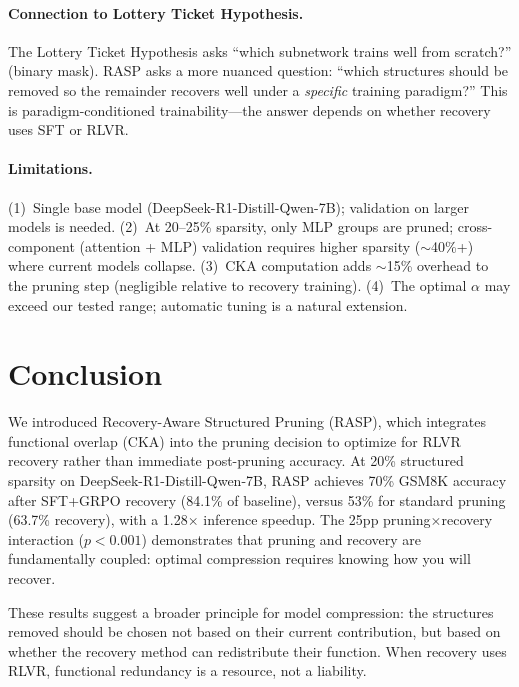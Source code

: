 \documentclass[11pt,a4paper]{article}
\newcommand{\method}{RASP}
\begin{document}
\paragraph{Connection to Lottery Ticket Hypothesis.} The Lottery Ticket Hypothesis asks ``which subnetwork trains well from scratch?'' (binary mask). \method{} asks a more nuanced question: ``which structures should be removed so the remainder recovers well under a \emph{specific} training paradigm?'' This is paradigm-conditioned trainability---the answer depends on whether recovery uses SFT or RLVR.

\paragraph{Limitations.} (1)~Single base model (DeepSeek-R1-Distill-Qwen-7B); validation on larger models is needed. (2)~At 20--25\% sparsity, only MLP groups are pruned; cross-component (attention + MLP) validation requires higher sparsity ($\sim$40\%+) where current models collapse. (3)~CKA computation adds $\sim$15\% overhead to the pruning step (negligible relative to recovery training). (4)~The optimal $\alpha$ may exceed our tested range; automatic tuning is a natural extension.

\section{Conclusion}
\label{sec:conclusion}

We introduced Recovery-Aware Structured Pruning (\method{}), which integrates functional overlap (CKA) into the pruning decision to optimize for RLVR recovery rather than immediate post-pruning accuracy. At 20\% structured sparsity on DeepSeek-R1-Distill-Qwen-7B, \method{} achieves 70\% GSM8K accuracy after SFT+GRPO recovery (84.1\% of baseline), versus 53\% for standard pruning (63.7\% recovery), with a 1.28$\times$ inference speedup. The 25pp pruning$\times$recovery interaction ($p < 0.001$) demonstrates that pruning and recovery are fundamentally coupled: optimal compression requires knowing how you will recover.

These results suggest a broader principle for model compression: the structures removed should be chosen not based on their current contribution, but based on whether the recovery method can redistribute their function. When recovery uses RLVR, functional redundancy is a resource, not a liability.
\end{document}
